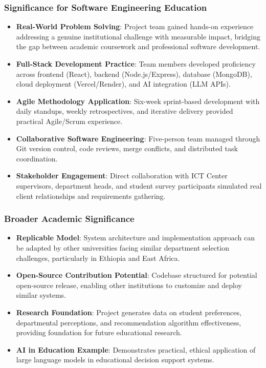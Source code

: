 \documentclass[12pt, a4paper]{article}
\begin{document}
\subsubsection*{Significance for Software Engineering Education}

\begin{itemize}[leftmargin=1.5em, itemsep=3pt]
    \item \textbf{Real-World Problem Solving}: Project team gained hands-on experience addressing a genuine institutional challenge with measurable impact, bridging the gap between academic coursework and professional software development.
    
    \item \textbf{Full-Stack Development Practice}: Team members developed proficiency across frontend (React), backend (Node.js/Express), database (MongoDB), cloud deployment (Vercel/Render), and AI integration (LLM APIs).
    
    \item \textbf{Agile Methodology Application}: Six-week sprint-based development with daily standups, weekly retrospectives, and iterative delivery provided practical Agile/Scrum experience.
    
    \item \textbf{Collaborative Software Engineering}: Five-person team managed through Git version control, code reviews, merge conflicts, and distributed task coordination.
    
    \item \textbf{Stakeholder Engagement}: Direct collaboration with ICT Center supervisors, department heads, and student survey participants simulated real client relationships and requirements gathering.
\end{itemize}

\subsubsection*{Broader Academic Significance}

\begin{itemize}[leftmargin=1.5em, itemsep=3pt]
    \item \textbf{Replicable Model}: System architecture and implementation approach can be adapted by other universities facing similar department selection challenges, particularly in Ethiopia and East Africa.
    
    \item \textbf{Open-Source Contribution Potential}: Codebase structured for potential open-source release, enabling other institutions to customize and deploy similar systems.
    
    \item \textbf{Research Foundation}: Project generates data on student preferences, departmental perceptions, and recommendation algorithm effectiveness, providing foundation for future educational research.
    
    \item \textbf{AI in Education Example}: Demonstrates practical, ethical application of large language models in educational decision support systems.
\end{itemize}
\end{document}
